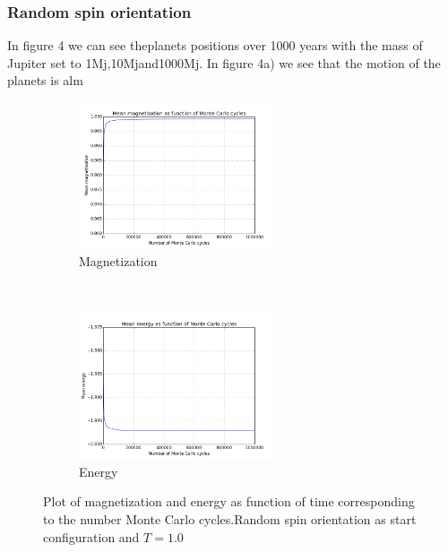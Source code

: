 \documentclass{article}
\begin{document}
\subsubsection*{Random spin orientation}

In  figure  4  we  can  see  theplanets positions over 1000 years with the mass of Jupiter set to 1Mj,10Mjand1000Mj.  In figure 4a) we see that the motion of the planets is alm

\begin{figure}[t!]
    \centering
    \begin{subfigure}[t]{0.6\textwidth}
        \centering
        \includegraphics[height=1.7in]{4cmagnetisationrandom.png}
        \caption{Magnetization}
    \end{subfigure}%
    ~ 
    \begin{subfigure}[t]{0.6\textwidth}
        \centering
        \includegraphics[height=1.7in]{4cenergyrandom.png}
        \caption{Energy}
    \end{subfigure}
    \caption{Plot of magnetization and energy as function of time corresponding to the number Monte Carlo cycles.Random spin orientation as start configuration and $T = 1.0$}
\end{figure}
\end{document}
